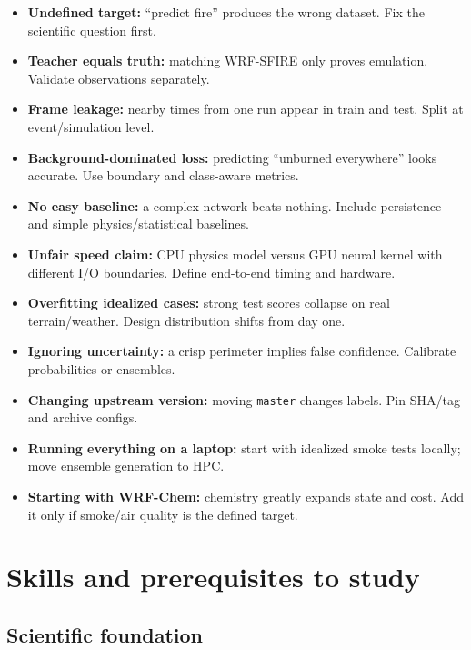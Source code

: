 \documentclass[11pt]{article}
\begin{document}
\begin{itemize}
  \item \textbf{Undefined target:} ``predict fire'' produces the wrong dataset. Fix the scientific question first.
  \item \textbf{Teacher equals truth:} matching WRF-SFIRE only proves emulation. Validate observations separately.
  \item \textbf{Frame leakage:} nearby times from one run appear in train and test. Split at event/simulation level.
  \item \textbf{Background-dominated loss:} predicting ``unburned everywhere'' looks accurate. Use boundary and class-aware metrics.
  \item \textbf{No easy baseline:} a complex network beats nothing. Include persistence and simple physics/statistical baselines.
  \item \textbf{Unfair speed claim:} CPU physics model versus GPU neural kernel with different I/O boundaries. Define end-to-end timing and hardware.
  \item \textbf{Overfitting idealized cases:} strong test scores collapse on real terrain/weather. Design distribution shifts from day one.
  \item \textbf{Ignoring uncertainty:} a crisp perimeter implies false confidence. Calibrate probabilities or ensembles.
  \item \textbf{Changing upstream version:} moving \texttt{master} changes labels. Pin SHA/tag and archive configs.
  \item \textbf{Running everything on a laptop:} start with idealized smoke tests locally; move ensemble generation to HPC.
  \item \textbf{Starting with WRF-Chem:} chemistry greatly expands state and cost. Add it only if smoke/air quality is the defined target.
\end{itemize}

\section{Skills and prerequisites to study}

\subsection{Scientific foundation}
\end{document}
